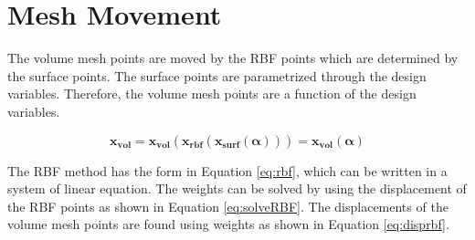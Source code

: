 \documentclass[letterpaper,12pt,]{article}
\begin{document}
\newcommand\del[2]{
\dfrac{\partial#1}{\partial#2}}
\newcommand\ddel[2]{
\dfrac{\partial^2#1}{\partial#2^2}}
\newcommand\ddelm[3]{
\dfrac{\partial^2#1}{\partial#2 \partial#3}}
\newcommand\Dt[2]{
\dfrac{d#1}{d#2}}
\newcommand\DDt[2]{
\dfrac{d^2#1}{d#2^2}}
\newcommand\mbf[1]{
\mathbf{#1}}
\newcommand\mbs[1]{
\boldsymbol{#1}}
\newcommand\xvol[0]{
\mbf{x_{vol}}}
\newcommand\xsurf[0]{
\mbf{x_{surf}}}
\newcommand\xrbf[0]{
\mbf{x_{rbf}}}
\newcommand\balfa[0]{
\mbs{\alpha}}
\newcommand\bR[0]{
\mbf{R}}
\newcommand\bw[0]{
\mbf{w}}
\newcommand\inv[1]{
\left[#1\right]^{-1}}
\newcommand\trans[1]{
\left[#1\right]^{T}}
\newcommand\sqbr[1]{
\left[#1\right]}
\newcommand\nrbf[0]{
N_{rbf}}
\newcommand\nxvol[0]{
N_{xvol}}
\newcommand\ncell[0]{
N_{cell}}
\newcommand\ndes[0]{
N_{des}}
\newcommand\bpsi[0]{
\mbs{\psi}}
\newcommand\blam[0]{
\mbs{\lambda}}
\newcommand\bgam[0]{
\mbs{\gamma}}
\newcommand\bbeta[0]{
\mbs{\beta}}
\newcommand\smt[1]{
\text{\footnotesize$#1$}}
\newcommand\nxn[2]{
	\smt{\left[ #1 \times #2 \right]}}
\newcommand\nxnxn[3]{
	\smt{\left[ #1 \times #2 \times #3\right]}}
\newcommand\blue[1]{
	{\color{blue}#1}}
\newcommand\red[1]{
	{\color{red}#1}}
\newcommand\green[1]{
	{\color{green}#1}}

\section*{Mesh Movement}

The volume mesh points are moved by the RBF points which are determined by the surface points.
The surface points are parametrized through the design variables.
Therefore, the volume mesh points are a function of the design variables.

\begin{equation}
	\xvol 
	= 
	\xvol(
	\xrbf(
	\xsurf(
	\balfa))) 
	= 
	\xvol(\balfa)
\end{equation}

The RBF method has the form in Equation \ref{eq:rbf}, which can be written in a system of linear equation.
The weights can be solved by using the displacement of the RBF points as shown in Equation \ref{eq:solveRBF}.
The displacements of the volume mesh points are found using weights as shown in Equation \ref{eq:disprbf}.
\end{document}
